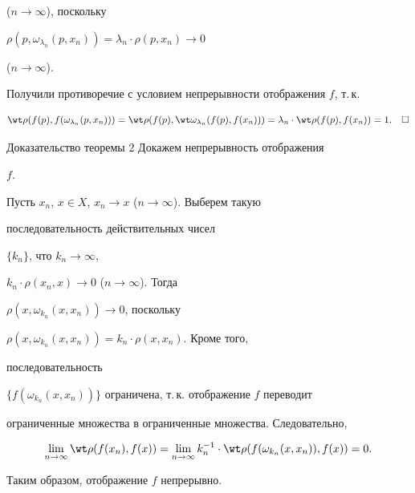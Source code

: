 ($n\to\infty$), поскольку 


$\rho(p,\omega_{\lambda_n}(p,x_n))=\lambda_n\cdot\rho(p,x_n)\to 0$ 


($n\to\infty$). 


Получили противоречие с условием непрерывности отображения $f$, т.\,к. 


$$ 


\wt\rho(f(p),f(\omega_{\lambda_n}(p,x_n)))= 


\wt\rho(f(p),\wt\omega_{\lambda_n}(f(p),f(x_n)))= 


\lambda_n\cdot\wt\rho(f(p),f(x_n))=1.\quad\square 


$$ 


 


\begin{pf*}{Доказательство теоремы 2} Докажем непрерывность отображения 


$f$. 


Пусть $x_n$, $x\in X$, $x_n\to x$ ($n\to\infty$). Выберем такую 


последовательность действительных чисел 


$\{k_n\}$, что $k_n\to\infty$, 


$k_n\cdot\rho(x_n,x)\to 0$ ($n\to\infty$). Тогда 


$\rho(x,\omega_{k_n}(x,x_n))\to 0$, поскольку 


$\rho(x,\omega_{k_n}(x,x_n))=k_n\cdot\rho(x,x_n)$. Кроме того, 


последовательность 


$\{f(\omega_{k_n}(x,x_n))\}$ ограничена, т.\,к. отображение $f$ переводит 


ограниченные множества в ограниченные множества. Следовательно, 


$$ 


\lim_{n\to\infty}\wt\rho(f(x_n),f(x))= 


\lim_{n\to\infty}k_n^{-1}\cdot\wt\rho(f(\omega_{k_n}(x,x_n)), 


f(x))=0. 


$$ 


Таким образом, отображение $f$ непрерывно. 


\end{pf*} 


 


